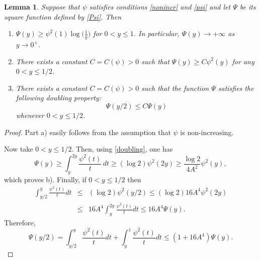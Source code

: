 \documentclass[11pt,letterpaper]{amsart}
\newtheorem{lem}{Lemma}[section]
\theoremstyle{definition}
\numberwithin{equation}{section}
\begin{document}
\begin{lem}
    \label{Psiprop}
Suppose that $\psi$ satisfies conditions \eqref{nonincr} and \eqref{psi} and let $\Psi$ be its square function defined by \eqref{Psi}. Then
\begin{enumerate}
\item[a)] $\Psi (y) \geq \psi^2 (1) \log \big ( \frac{1}{y} \big )$ for $0 < y \leq 1$. In particular, $\Psi (y) \to +\infty$ as $y \to 0^+$.
\item[b)] There exists a constant $C=C(\psi) >0$ such that $\Psi (y) \geq C \psi^2 (y)$ for any $0< y \leq 1/2$.
\item[c)] There exists a constant $C=C(\psi) >0$ such that the function $\Psi$ satisfies the following doubling property:
$$
\Psi(y/2) \leq C \Psi (y)
$$
whenever $0 < y \leq 1/2$.
\end{enumerate}
\end{lem}

\begin{proof}
Part a) easily follows from the assumption that  $\psi $ is non-increasing.  

Now take $0< y \leq 1/2$. Then, using \eqref{doubling}, one has 
$$
\Psi (y) \geq \int_y^{2y}\frac{\psi^2 (t)}{t} \, dt \geq (\log 2) \psi^2(2y) \geq \frac{\log 2}{4 A^2} \psi^2 (y),
$$
which proves b). Finally, if $0< y \leq 1/2$ then
\begin{eqnarray*}
\int_{y/2}^y \frac{\psi^2 (t)}{t} dt & \leq &  (\log 2)\psi^2 (y/2) \leq (\log 2) 16 A^4 \psi^2 (2y)  \\
& \leq &  16 A^4  \int_y^{2y} \frac{\psi^2 (t)}{t} dt \leq 16 A^4 \Psi (y)   . 
\end{eqnarray*}
Therefore, 
$$
\Psi (y/2) = \int_{y/2}^y \frac{\psi^2 (t)}{t}dt + \int_y^1  \frac{\psi^2 (t)}{t}dt \leq (1+ 16 A^4) \Psi (y) . 
$$
\end{proof}
\end{document}
